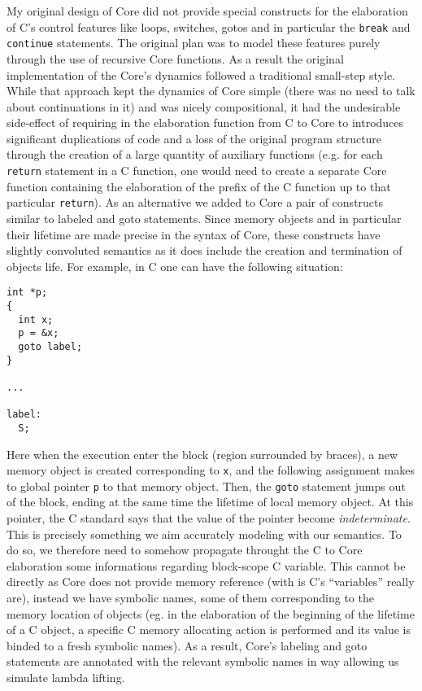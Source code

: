 \documentclass[11pt,a4paper,twocolumn]{article}
\begin{document}
My original design of Core did not provide special constructs for the
elaboration of C's control features like loops, switches, gotos and in
particular the \texttt{break} and \texttt{continue} statements. The
original plan was to model these features purely through the use of
recursive Core functions. As a result the original implementation of
the Core's dynamics followed a traditional small-step style.  While
that approach kept the dynamics of Core simple (there was no need to
talk about continuations in it) and was nicely compositional, it had
the undesirable side-effect of requiring in the elaboration function
from C to Core to introduces significant duplications of code and a
loss of the original program structure through the creation of a large
quantity of auxiliary functions (e.g. for each \texttt{return}
statement in a C function, one would need to create a separate Core
function containing the elaboration of the prefix of the C
function up to that particular \texttt{return}). As an alternative we
added to Core a pair of constructs similar to labeled and goto
statements. Since memory objects and in particular their lifetime are
made precise in the syntax of Core, these constructs have slightly
convoluted semantics as it does include the creation and termination
of objects life. For example, in C one can have the following situation:
\begin{verbatim}
int *p;
{
  int x;
  p = &x;
  goto label;
}

...

label:
  S;
\end{verbatim}

Here when the execution enter the block (region surrounded by braces),
a new memory object is created corresponding to \texttt{x}, and the
following assignment makes to global pointer \texttt{p} to that memory
object. Then, the \texttt{goto} statement jumps out of the block,
ending at the same time the lifetime of local memory object. At this
pointer, the C standard says that the value of the pointer become
{\it indeterminate}. This is precisely something we aim accurately
modeling with our semantics. To do so, we therefore need to somehow
propagate throught the C to Core elaboration some informations
regarding block-scope C variable. This cannot be directly as Core does
not provide memory reference (with is C's ``variables'' really are),
instead we have symbolic names, some of them corresponding to the
memory location of objects (eg. in the elaboration of the beginning of
the lifetime of a C object, a specific C memory allocating action is
performed and its value is binded to a fresh symbolic names). As a
result, Core's labeling and goto statements are annotated with the
relevant symbolic names in way allowing us simulate lambda lifting.
\end{document}
